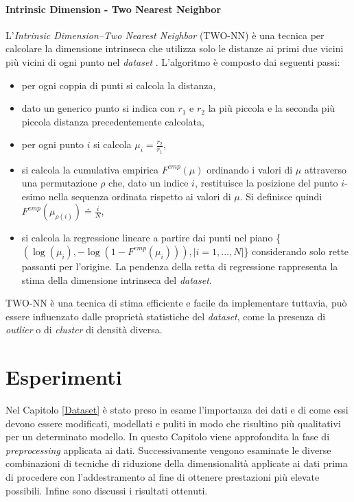 \documentclass[12pt,italian]{report}
\begin{document}
	\subsubsection{Intrinsic Dimension - Two Nearest Neighbor}
	\label{two-nn}
	L'\textit{Intrinsic Dimension--Two Nearest Neighbor} (TWO-NN) è una tecnica per calcolare la dimensione intrinseca che utilizza solo le distanze ai primi due vicini più vicini di ogni punto nel \textit{dataset} \cite{Facco2017-pd}. L'algoritmo è composto dai seguenti passi:
	\begin{itemize}
		\item per ogni coppia di punti si calcola la distanza,
		\item dato un generico punto si indica con $r_1$ e $r_2$ la più piccola e la seconda più piccola distanza precedentemente calcolata,
		\item per ogni punto $i$ si calcola $\mu_i = \frac{r_2}{r_1}$,
		\item si calcola la cumulativa empirica $F^{emp}(\mu)$ ordinando i valori di $\mu$ attraverso una permutazione $\rho$ che, dato un indice $i$, restituisce la posizione del punto $i$-esimo nella sequenza ordinata rispetto ai valori di $\mu$. Si definisce quindi $F^{emp}(\mu_{\rho(i)}) \doteq \frac{i}{N}$,
		\item si calcola la regressione lineare a partire dai punti nel piano \{$(\log(\mu_i), -\log(1-F^{emp}(\mu_i))), |i=1,...,N|$\} considerando solo rette passanti per l'origine. La pendenza della retta di regressione rappresenta la stima della dimensione intrinseca del \textit{dataset}.
	\end{itemize}
	TWO-NN è una tecnica di stima efficiente e facile da implementare tuttavia, può essere influenzato dalle proprietà statistiche del \textit{dataset}, come la presenza di \textit{outlier} o di \textit{cluster} di densità diversa.
	
	
	
	
	\chapter{Esperimenti}
	\label{Esperimenti}
	Nel Capitolo \ref{Dataset} è stato preso in esame l'importanza dei dati e di come essi devono essere modificati, modellati e puliti in modo che risultino più qualitativi per un determinato modello. In questo Capitolo viene approfondita la fase di \textit{preprocessing} applicata ai dati. Successivamente vengono esaminate le diverse combinazioni di tecniche di riduzione della dimensionalità applicate ai dati prima di procedere con l'addestramento al fine di ottenere prestazioni più elevate possibili. Infine sono discussi i risultati ottenuti.
	
\end{document}
